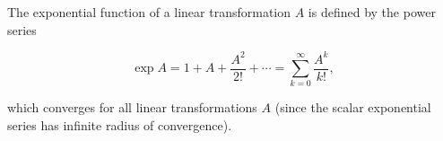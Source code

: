 The exponential function of a linear transformation $A$ is defined by the power series

$$\exp A = 1 + A + \frac{A^2}{2!} + \cdots = \sum_{k=0}^{\infty} \frac{A^k}{k!},$$

which converges for all linear transformations $A$ (since the scalar exponential series has infinite radius of convergence).
